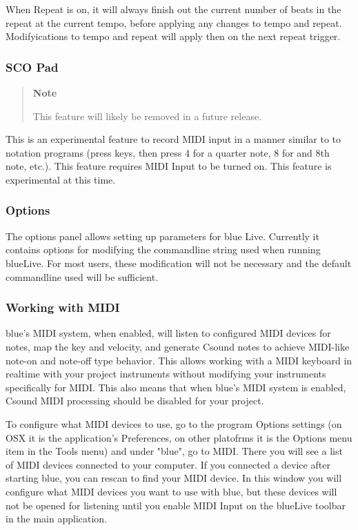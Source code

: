 When Repeat is on, it will always finish out the current number of beats
in the repeat at the current tempo, before applying any changes to tempo
and repeat. Modifyications to tempo and repeat will apply then on the
next repeat trigger.

\subsubsection{SCO Pad}

\begin{quote}
\textbf{Note}

This feature will likely be removed in a future release.
\end{quote}

This is an experimental feature to record MIDI input in a manner similar
to to notation programs (press keys, then press 4 for a quarter note, 8
for and 8th note, etc.). This feature requires MIDI Input to be turned
on. This feature is experimental at this time.

\subsubsection{Options}

The options panel allows setting up parameters for blue Live. Currently
it contains options for modifying the commandline string used when
running blueLive. For most users, these modification will not be
necessary and the default commandline used will be sufficient.

\subsubsection{Working with MIDI}

blue's MIDI system, when enabled, will listen to configured MIDI devices
for notes, map the key and velocity, and generate Csound notes to
achieve MIDI-like note-on and note-off type behavior. This allows
working with a MIDI keyboard in realtime with your project instruments
without modifying your instruments specifically for MIDI. This also
means that when blue's MIDI system is enabled, Csound MIDI processing
should be disabled for your project.

To configure what MIDI devices to use, go to the program Options
settings (on OSX it is the application's Preferences, on other platofrms
it is the Options menu item in the Tools menu) and under "blue", go to
MIDI. There you will see a list of MIDI devices connected to your
computer. If you connected a device after starting blue, you can rescan
to find your MIDI device. In this window you will configure what MIDI
devices you want to use with blue, but these devices will not be opened
for listening until you enable MIDI Input on the blueLive toolbar in the
main application.

